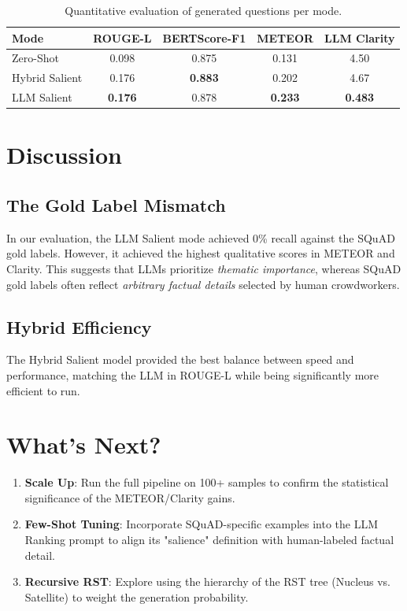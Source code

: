 \documentclass[11pt,a4paper]{article}
\begin{document}
\begin{table}[h!]
\centering
\begin{tabular}{@{}lcccc@{}}
\toprule
\textbf{Mode} & \textbf{ROUGE-L} & \textbf{BERTScore-F1} & \textbf{METEOR} & \textbf{LLM Clarity} \\ \midrule
Zero-Shot      & 0.098            & 0.875                 & 0.131           & 4.50                 \\
Hybrid Salient & 0.176            & \textbf{0.883}        & 0.202           & 4.67                 \\
LLM Salient    & \textbf{0.176}   & 0.878                 & \textbf{0.233}  & \textbf{0.483}       \\ \bottomrule
\end{tabular}
\caption{Quantitative evaluation of generated questions per mode.}
\end{table}

\section{Discussion}
\subsection{The Gold Label Mismatch}
In our evaluation, the LLM Salient mode achieved 0\% recall against the SQuAD gold labels. However, it achieved the highest qualitative scores in METEOR and Clarity. This suggests that LLMs prioritize \textit{thematic importance}, whereas SQuAD gold labels often reflect \textit{arbitrary factual details} selected by human crowdworkers.

\subsection{Hybrid Efficiency}
The Hybrid Salient model provided the best balance between speed and performance, matching the LLM in ROUGE-L while being significantly more efficient to run.

\section{What's Next?}
\begin{enumerate}
    \item \textbf{Scale Up}: Run the full pipeline on 100+ samples to confirm the statistical significance of the METEOR/Clarity gains.
    \item \textbf{Few-Shot Tuning}: Incorporate SQuAD-specific examples into the LLM Ranking prompt to align its "salience" definition with human-labeled factual detail.
    \item \textbf{Recursive RST}: Explore using the hierarchy of the RST tree (Nucleus vs. Satellite) to weight the generation probability.
\end{enumerate}
\end{document}
